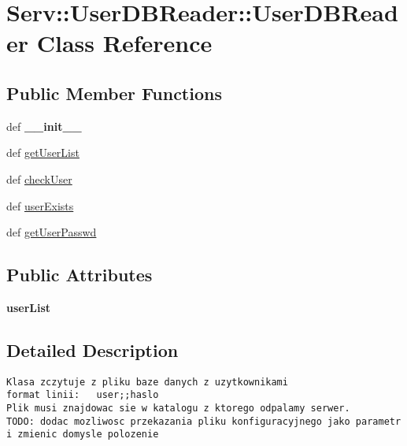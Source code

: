 \hypertarget{class_serv_1_1_user_d_b_reader_1_1_user_d_b_reader}{
\section{Serv::UserDBReader::UserDBReader Class Reference}
\label{class_serv_1_1_user_d_b_reader_1_1_user_d_b_reader}
}
\subsection*{Public Member Functions}
\begin{CompactItemize}
\item 
\hypertarget{class_serv_1_1_user_d_b_reader_1_1_user_d_b_reader_f3811b4b6123fe47153f9d87631322a9}{
def \textbf{\_\-\_\-init\_\-\_\-}}
\label{class_serv_1_1_user_d_b_reader_1_1_user_d_b_reader_f3811b4b6123fe47153f9d87631322a9}

\item 
def \hyperlink{class_serv_1_1_user_d_b_reader_1_1_user_d_b_reader_84890922ae8efd8ecec178874ec296f6}{getUserList}
\item 
def \hyperlink{class_serv_1_1_user_d_b_reader_1_1_user_d_b_reader_1fa47b601f3968090cf56b959f50ca94}{checkUser}
\item 
def \hyperlink{class_serv_1_1_user_d_b_reader_1_1_user_d_b_reader_e3a006e064956d5d09ad1bcaa4c3315f}{userExists}
\item 
def \hyperlink{class_serv_1_1_user_d_b_reader_1_1_user_d_b_reader_d77c35dbbb9ddf154ab8809463a254c0}{getUserPasswd}
\end{CompactItemize}
\subsection*{Public Attributes}
\begin{CompactItemize}
\item 
\hypertarget{class_serv_1_1_user_d_b_reader_1_1_user_d_b_reader_69dbf266bd3f0f66f21f30d5bd5fef82}{
\textbf{userList}}
\label{class_serv_1_1_user_d_b_reader_1_1_user_d_b_reader_69dbf266bd3f0f66f21f30d5bd5fef82}

\end{CompactItemize}


\subsection{Detailed Description}


\footnotesize\begin{verbatim}Klasa zczytuje z pliku baze danych z uzytkownikami
format linii:   user;;haslo
Plik musi znajdowac sie w katalogu z ktorego odpalamy serwer.
TODO: dodac mozliwosc przekazania pliku konfiguracyjnego jako parametr i zmienic domysle polozenie

\end{verbatim}
\normalsize
 

